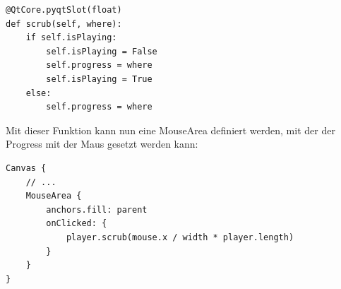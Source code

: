 \documentclass[a4paper]{article}
\begin{document}
\begin{verbatim}
@QtCore.pyqtSlot(float)
def scrub(self, where):
    if self.isPlaying:
        self.isPlaying = False
        self.progress = where
        self.isPlaying = True
    else:
        self.progress = where
\end{verbatim}

Mit dieser Funktion kann nun eine MouseArea definiert werden, mit der der Progress mit der Maus gesetzt werden kann:

\begin{verbatim}
Canvas {
    // ...
    MouseArea {
        anchors.fill: parent
        onClicked: {
            player.scrub(mouse.x / width * player.length)
        }
    }
}
\end{verbatim}
\end{document}
